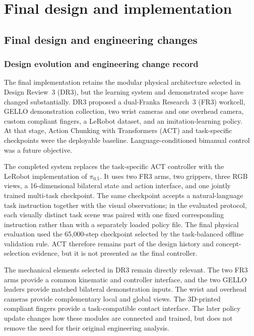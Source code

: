 \setlength{\emergencystretch}{2em}

\chapter{Final design and implementation}\label{chap:final-design}

\section{Final design and engineering changes}

\subsection{Design evolution and engineering change record}

The final implementation retains the modular physical architecture selected in Design Review~3 (DR3), but the learning system and demonstrated scope have changed substantially. DR3 proposed a dual-Franka Research~3 (FR3) workcell, GELLO demonstration collection, two wrist cameras and one overhead camera, custom compliant fingers, a LeRobot dataset, and an imitation-learning policy. At that stage, Action Chunking with Transformers (ACT) and task-specific checkpoints were the deployable baseline. Language-conditioned bimanual control was a future objective.

The completed system replaces the task-specific ACT controller with the LeRobot implementation of $\pi_{0.5}$. It uses two FR3 arms, two grippers, three RGB views, a 16-dimensional bilateral state and action interface, and one jointly trained multi-task checkpoint. The same checkpoint accepts a natural-language task instruction together with the visual observations; in the evaluated protocol, each visually distinct task scene was paired with one fixed corresponding instruction rather than with a separately loaded policy file. The final physical evaluation used the 65,000-step checkpoint selected by the task-balanced offline validation rule. ACT therefore remains part of the design history and concept-selection evidence, but it is not presented as the final controller.

The mechanical elements selected in DR3 remain directly relevant. The two FR3 arms provide a common kinematic and controller interface, and the two GELLO leaders provide matched bilateral demonstration inputs. The wrist and overhead cameras provide complementary local and global views. The 3D-printed compliant fingers provide a task-compatible contact interface. The later policy update changes how these modules are connected and trained, but does not remove the need for their original engineering analysis.

